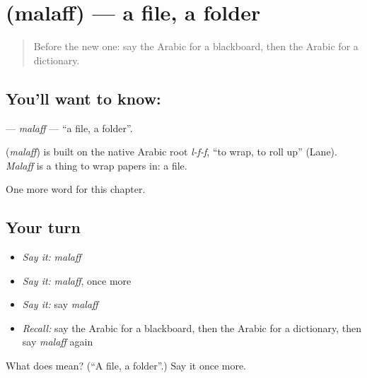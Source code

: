 \section[\texorpdfstring{\ar{ملف} (malaff)}{ملف (malaff)}]{ (malaff) — a file, a folder}

\label{lesson:AR-C274-malaff}



\begin{quote}
Before the new one: say the Arabic for a blackboard, then the Arabic for a dictionary.
\end{quote}

\subsection*{You'll want to know: }
\textbf{} — \emph{malaff} — \textquotedblleft{}a file, a folder\textquotedblright{}.

\begin{cousinweb}
\textbf{} (\emph{malaff}) is built on the native Arabic root \emph{l-f-f}, \textquotedblleft{}to wrap, to roll up\textquotedblright{} (Lane). \emph{Malaff} is a thing to wrap papers in: a file.
\end{cousinweb}

\begin{grammarlens}[title={What you've built}]
One more word for this chapter.
\end{grammarlens}

\subsection*{Your turn}
\begin{itemize}
\raggedright
  \item \emph{Say it:} \emph{malaff}
  \item \emph{Say it:} \emph{malaff}, once more
  \item \emph{Say it:} say \emph{malaff}
  \item \emph{Recall:} say the Arabic for a blackboard, then the Arabic for a dictionary, then say \emph{malaff} again
\end{itemize}

\begin{tcolorbox}[breakable,colback=teal!4,colframe=teal!35!black,title={Before you move on}]
What does  mean? (\textquotedblleft{}A file, a folder\textquotedblright{}.) Say it once more.
\end{tcolorbox}
